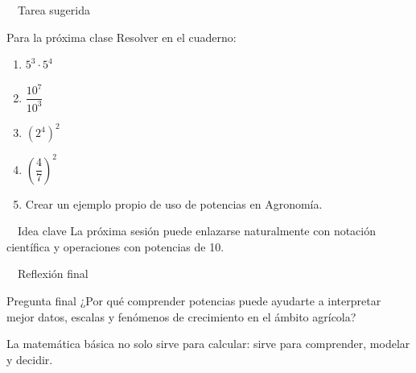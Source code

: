 \documentclass[aspectratio=169,10pt,handout]{beamer}
\newcommand{\iconoCierre}{\faCheckCircle}
\newcommand{\iconoIdea}{\faLightbulb}
\newcommand{\iconoTarea}{\faBook}
\newenvironment{ideaBox}
{\begin{exampleblock}{\iconoIdea\ \ Idea clave}}
	{\end{exampleblock}}
\begin{document}
	\begin{frame}{\iconoTarea\ \ Tarea sugerida}
		\begin{block}{Para la próxima clase}
			Resolver en el cuaderno:
			\begin{enumerate}
				\item \(5^3\cdot5^4\)
				\item \(\dfrac{10^7}{10^3}\)
				\item \((2^4)^2\)
				\item \(\left(\dfrac{4}{7}\right)^2\)
				\item Crear un ejemplo propio de uso de potencias en Agronomía.
			\end{enumerate}
		\end{block}
		
		\begin{ideaBox}
			La próxima sesión puede enlazarse naturalmente con notación científica y operaciones con potencias de 10.
		\end{ideaBox}
	\end{frame}
	
	\begin{frame}{\iconoCierre\ \ Reflexión final}
		\begin{exampleblock}{Pregunta final}
			¿Por qué comprender potencias puede ayudarte a interpretar mejor datos, escalas y fenómenos de crecimiento en el ámbito agrícola?
		\end{exampleblock}
		
		\vspace{0.5cm}
		\begin{center}
			{\Large\color{USTTeal}\faSeedling}
			
			\vspace{0.25cm}
			{\normalsize\textcolor{USTGray}{La matemática básica no solo sirve para calcular: sirve para comprender, modelar y decidir.}}
		\end{center}
	\end{frame}
	
\end{document}
